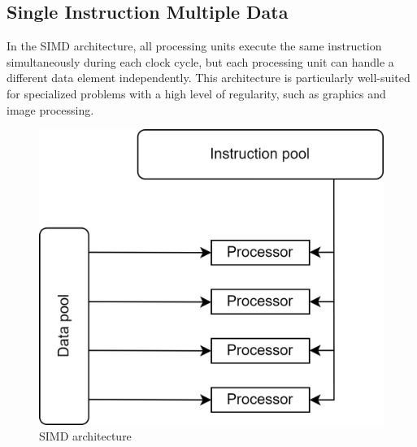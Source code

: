 \subsection{Single Instruction Multiple Data}
In the SIMD architecture, all processing units execute the same instruction simultaneously during each clock cycle, but each processing unit can handle a different data element independently.
This architecture is particularly well-suited for specialized problems with a high level of regularity, such as graphics and image processing.
\begin{figure}[H]
    \centering
    \includegraphics[width=0.3\linewidth]{images/simd.png}
    \caption{SIMD architecture}
\end{figure}


